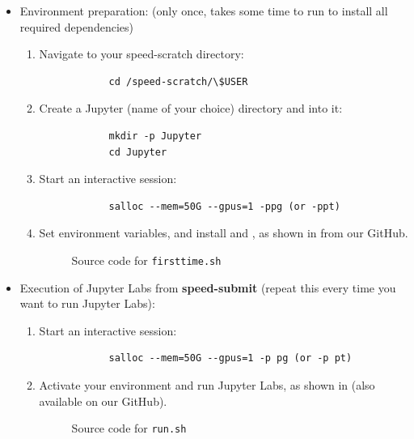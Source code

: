 \begin{itemize}
	\item Environment preparation: (only once, takes some time to run to install all required dependencies)
	\begin{enumerate}
		\item Navigate to your speed-scratch directory:
		\begin{verbatim}
			cd /speed-scratch/\$USER
		\end{verbatim}

		\item Create a Jupyter (name of your choice) directory and  into it:
		\begin{verbatim}
			mkdir -p Jupyter
			cd Jupyter
		\end{verbatim}

		\item Start an interactive session:
		\begin{verbatim}
			salloc --mem=50G --gpus=1 -ppg (or -ppt)
		\end{verbatim}
		
		\item
		Set  environment variables, and install  and ,
		as shown in  from our GitHub.
		
		\begin{figure}[htpb]
			\tiny
			
			\normalsize
			\caption{Source code for \texttt{firsttime.sh}}
			\label{fig:firsttime.sh}
		\end{figure}
	\end{enumerate}

	\item
	Execution of Jupyter Labs from \textbf{speed-submit} (repeat this every time you want to run Jupyter Labs):
	\begin{enumerate}
		\item Start an interactive session:
		\begin{verbatim}
			salloc --mem=50G --gpus=1 -p pg (or -p pt)
		\end{verbatim}

		\item
		Activate your  environment and run Jupyter Labs, as shown in
		 (also available on our GitHub).
		
		\begin{figure}[htpb]
			\scriptsize
			
			\normalsize
			\caption{Source code for \texttt{run.sh}}
			\label{fig:run.sh}
		\end{figure}


\end{enumerate}
\end{itemize}
